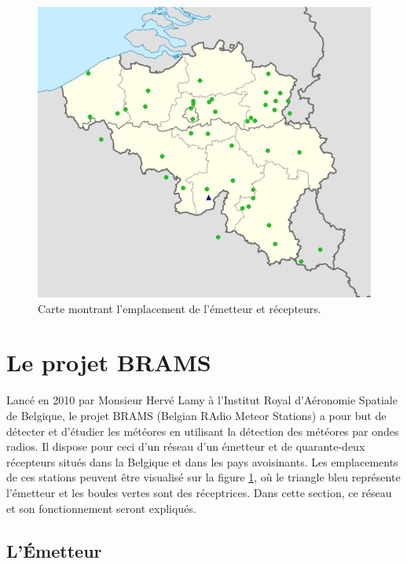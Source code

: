 \documentclass[11pt]{article}
\begin{document}
\newpage

\begin{figure}[t]
    \begin{center}
        \includegraphics[scale=1]{station_map.png}
        \caption{Carte montrant l'emplacement de l'émetteur et récepteurs.}
        \label{fig:station_map}
    \end{center}
\end{figure}

\section{Le projet BRAMS}

Lancé en 2010 par Monsieur Hervé Lamy à l'Institut Royal d'Aéronomie Spatiale de Belgique, le projet BRAMS (Belgian RAdio Meteor Stations) a pour but de détecter et d'étudier les météores en utilisant la détection des météores par ondes radios.
Il dispose pour ceci d'un réseau d'un émetteur et de quarante-deux récepteurs situés dans la Belgique et dans les pays avoisinants.
Les emplacements de ces stations peuvent être visualisé sur la figure \ref{fig:station_map}, où le triangle bleu représente l'émetteur et les boules vertes sont des réceptrices.
Dans cette section, ce réseau et son fonctionnement seront expliqués.

\subsection{L'Émetteur}
\end{document}

